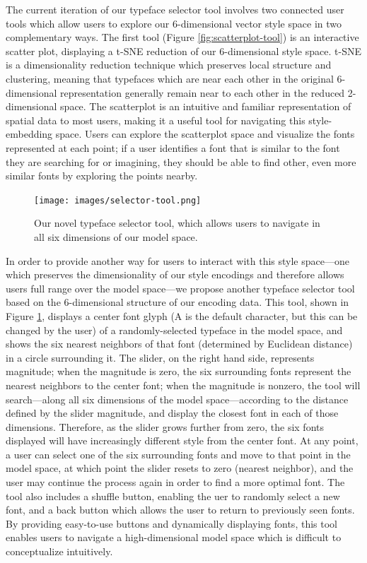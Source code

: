 The current iteration of our typeface selector tool involves two connected user tools which allow users to explore our 6-dimensional vector style space in two complementary ways. The first tool (Figure \ref{fig:scatterplot-tool}) is an interactive scatter plot, displaying a t-SNE reduction of our 6-dimensional style space. t-SNE is a dimensionality reduction technique which preserves local structure and clustering, meaning that typefaces which are near each other in the original 6-dimensional representation generally remain near to each other in the reduced 2-dimensional space. The scatterplot is an intuitive and familiar representation of spatial data to most users, making it a useful tool for navigating this style-embedding space. Users can explore the scatterplot space and visualize the fonts represented at each point; if a user identifies a font that is similar to the font they are searching for or imagining, they should be able to find other, even more similar fonts by exploring the points nearby. 

\begin{figure}[h]
    \centering
    \texttt{[image: images/selector-tool.png]}
    \caption{Our novel typeface selector tool, which allows users to navigate in all six dimensions of our model space.}
    \label{fig:selector-tool}
\end{figure}

In order to provide another way for users to interact with this style space—one which preserves the dimensionality of our style encodings and therefore allows users full range over the model space—we propose another typeface selector tool based on the 6-dimensional structure of our encoding data. This tool, shown in Figure \ref{fig:selector-tool}, displays a center font glyph (A is the default character, but this can be changed by the user) of a randomly-selected typeface in the model space, and shows the six nearest neighbors of that font (determined by Euclidean distance) in a circle surrounding it. The slider, on the right hand side, represents magnitude; when the magnitude is zero, the six surrounding fonts represent the nearest neighbors to the center font; when the magnitude is nonzero, the tool will search—along all six dimensions of the model space—according to the distance defined by the slider magnitude, and display the closest font in each of those dimensions. Therefore, as the slider grows further from zero, the six fonts displayed will have increasingly different style from the center font. At any point, a user can select one of the six surrounding fonts and move to that point in the model space, at which point the slider resets to zero (nearest neighbor), and the user may continue the process again in order to find a more optimal font. The tool also includes a shuffle button, enabling the uer to randomly select a new font, and a back button which allows the user to return to previously seen fonts. By providing easy-to-use buttons and dynamically displaying fonts, this tool enables users to navigate a high-dimensional model space which is difficult to conceptualize intuitively.

